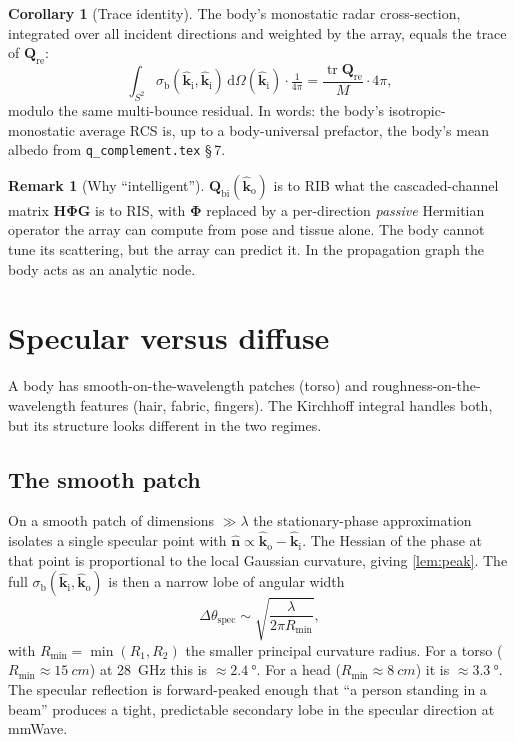\documentclass[11pt,a4paper]{article}
\theoremstyle{definition}
\newtheorem{corollary}[corollary]{Corollary}
\newtheorem{remark}[remark]{Remark}
\newcommand{\nhat}{\hat{\bm{n}}}
\DeclareMathOperator{\tr}{tr}
\newcommand{\diff}{\mathrm{d}}
\newcommand{\Qref}{\mathbf{Q}_{\mathrm{re}}}
\newcommand{\kin}{\hat{\bm{k}}_{\mathrm{i}}}
\newcommand{\kout}{\hat{\bm{k}}_{\mathrm{o}}}
\newcommand{\sigb}{\sigma_{\mathrm{b}}}
\newcommand{\Qbist}{\mathbf{Q}_{\mathrm{bi}}}
\begin{document}
\begin{corollary}[Trace identity]\label{cor:trace}
The body's monostatic radar cross-section, integrated over all
incident directions and weighted by the array, equals the trace of
$\Qref$:
\[
  \int_{S^2}\!\!\sigb(\kin,\kin)\,\diff\Omega(\kin)
  \cdot \tfrac{1}{4\pi}=\frac{\tr\Qref}{M}\cdot 4\pi,
\]
modulo the same multi-bounce residual.  In words: the body's
isotropic-monostatic average RCS is, up to a body-universal prefactor,
the body's mean albedo from \texttt{q\_complement.tex} \S\,7.
\end{corollary}

\begin{remark}[Why ``intelligent'']
$\Qbist(\kout)$ is to RIB what the cascaded-channel matrix
$\mathbf{H}\mathbf{\Phi}\mathbf{G}$ is to RIS, with $\mathbf{\Phi}$
replaced by a per-direction \emph{passive} Hermitian operator the
array can compute from pose and tissue alone.  The body cannot tune
its scattering, but the array can predict it.  In the propagation
graph the body acts as an analytic node.
\end{remark}

\section{Specular versus diffuse}\label{sec:specdiff}

A body has smooth-on-the-wavelength patches (torso) and
roughness-on-the-wavelength features (hair, fabric, fingers).
The Kirchhoff integral handles both, but its structure looks different
in the two regimes.

\subsection{The smooth patch}

On a smooth patch of dimensions $\gg\lambda$ the stationary-phase
approximation isolates a single specular point with
$\nhat\propto\kout-\kin$.  The Hessian of the phase at that point is
proportional to the local Gaussian curvature, giving
\cref{lem:peak}.  The full $\sigb(\kin,\kout)$ is then a narrow lobe
of angular width
\begin{equation}\label{eq:lobe}
  \Delta\theta_{\mathrm{spec}}\sim
  \sqrt{\frac{\lambda}{2\pi R_{\min}}},
\end{equation}
with $R_{\min}=\min(R_1,R_2)$ the smaller principal curvature radius.
For a torso ($R_{\min}\approx\SI{15}{cm}$) at \SI{28}{GHz} this is
$\approx \SI{2.4}{\degree}$.  For a head
($R_{\min}\approx\SI{8}{cm}$) it is $\approx \SI{3.3}{\degree}$.  The
specular reflection is forward-peaked enough that ``a person standing
in a beam'' produces a tight, predictable secondary lobe in the
specular direction at mmWave.
\end{document}
